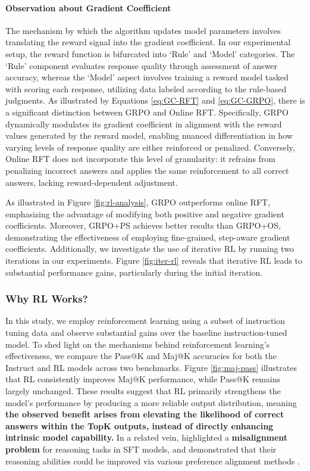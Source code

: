 \begin{itemize}[topsep=0pt]
\begin{itemize}[topsep=0pt]
\paragraph{Observation about Gradient Coefficient} The mechanism by which the algorithm updates model parameters involves translating the reward signal into the gradient coefficient. In our experimental setup, the reward function is bifurcated into `Rule' and `Model' categories. The `Rule' component evaluates response quality through assessment of answer accuracy, whereas the `Model' aspect involves training a reward model tasked with scoring each response, utilizing data labeled according to the rule-based judgments. As illustrated by Equations \ref{eq:GC-RFT} and \ref{eq:GC-GRPO}, there is a significant distinction between GRPO and Online RFT. Specifically, GRPO dynamically modulates its gradient coefficient in alignment with the reward values generated by the reward model, enabling nuanced differentiation in how varying levels of response quality are either reinforced or penalized. Conversely, Online RFT does not incorporate this level of granularity: it refrains from penalizing incorrect answers and applies the same reinforcement to all correct answers, lacking reward-dependent adjustment.

As illustrated in Figure \ref{fig:rl-analysis}, GRPO outperforms online RFT, emphasizing the advantage of modifying both positive and negative gradient coefficients. Moreover, GRPO+PS achieves better results than GRPO+OS, demonstrating the effectiveness of employing fine-grained, step-aware gradient coefficients. Additionally, we investigate the use of iterative RL by running two iterations in our experiments. Figure \ref{fig:iter-rl} reveals that iterative RL leads to substantial performance gains, particularly during the initial iteration.

\subsubsection{Why RL Works?} In this study, we employ reinforcement learning using a subset of instruction tuning data and observe substantial gains over the baseline instruction-tuned model. To shed light on the mechanisms behind reinforcement learning's effectiveness, we compare the Pass@K and Maj@K accuracies for both the Instruct and RL models across two benchmarks. Figure \ref{fig:maj-pass} illustrates that RL consistently improves Maj@K performance, while Pass@K remains largely unchanged. These results suggest that RL primarily strengthens the model’s performance by producing a more reliable output distribution, meaning \textbf{the observed benefit arises from elevating the likelihood of correct answers within the TopK outputs, instead of directly enhancing intrinsic model capability.} In a related vein, \citep{wang2023making} highlighted a \textbf{misalignment problem} for reasoning tasks in SFT models, and demonstrated that their reasoning abilities could be improved via various preference alignment methods \citep{yuan2023rrhf,song2023preference,wang2023making}.


\end{itemize}
\end{itemize}
